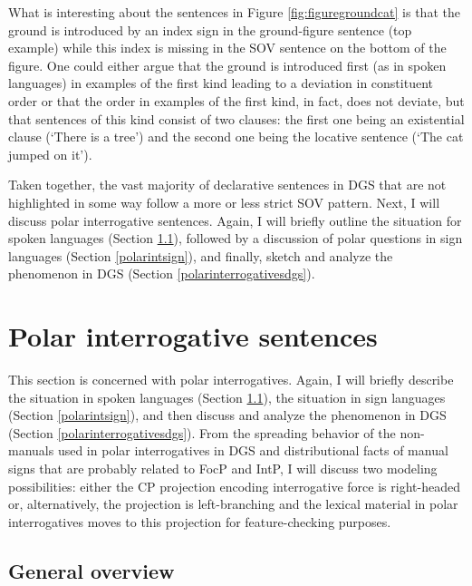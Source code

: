 \clearpage 
What is interesting about the sentences in Figure \ref{fig:figuregroundcat} is that the ground is introduced by an index sign in the ground-figure sentence (top example) while this index is missing in the SOV sentence on the bottom of the figure. One could either argue that the ground is introduced first (as in spoken languages) in examples of the first kind leading to a deviation in constituent order or that the order in examples of the first kind, in fact, does not deviate, but that sentences of this kind consist of two clauses: the first one being an existential clause (`There is a tree') and the second one being the locative sentence (`The cat jumped on it'). 

Taken together, the vast majority of declarative sentences in DGS that are not highlighted in some way follow a more or less strict SOV pattern. Next, I will discuss polar interrogative sentences. Again, I will briefly outline the situation for spoken languages (Section \ref{generalpolar}), followed by a discussion of polar questions in sign languages (Section \ref{polarintsign}), and finally, sketch and analyze the phenomenon in DGS (Section \ref{polarinterrogativesdgs}).

\largerpage
\section{Polar interrogative sentences}\label{polargeneralsectionlabel}
This section is concerned with polar interrogatives. Again, I will briefly describe the situation in spoken languages (Section \ref{generalpolar}), the situation in sign languages (Section \ref{polarintsign}), and then discuss and analyze the phenomenon in DGS (Section \ref{polarinterrogativesdgs}). From the spreading behavior of the non-manuals used in polar interrogatives in DGS and distributional facts of manual signs that are probably related to FocP and IntP, I will discuss two modeling possibilities: either the  CP projection encoding interrogative force is right-headed or, alternatively, the projection is left-branching and the lexical material in polar interrogatives moves to this projection for feature-checking purposes. %


\subsection{General overview}\label{generalpolar}

